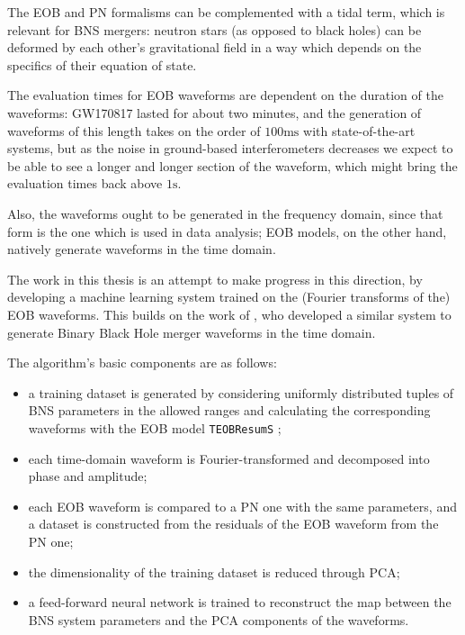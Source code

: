 \documentclass[main.tex]{subfiles}
\begin{document}
The \ac{EOB} and \ac{PN} formalisms can be complemented with a tidal term, which is relevant for \ac{BNS} mergers: neutron stars (as opposed to black holes) can be deformed by each other's gravitational field in a way which depends on the specifics of their equation of state. 

The evaluation times for \ac{EOB} waveforms are dependent on the duration of the waveforms: GW170817 lasted for about two minutes, and the generation of waveforms of this length takes on the order of $100\text{ms}$ with state-of-the-art systems, but as the noise in ground-based interferometers decreases we expect to be able to see a longer and longer section of the waveform, which might bring the evaluation times back above $1\text{s}$. 

Also, the waveforms ought to be generated in the frequency domain, since that form is the one which is used in data analysis;
EOB models, on the other hand, natively generate waveforms in the time domain. 

The work in this thesis is an attempt to make progress in this direction, by developing a machine learning system trained on the (Fourier transforms of the) \ac{EOB} waveforms. 
This builds on the work of \textcite{schmidtMachineLearningGravitational2020}, who developed a similar system to generate Binary Black Hole merger waveforms in the time domain.

The algorithm's basic components are as follows:
\begin{itemize}
    \item a training dataset is generated by considering uniformly distributed tuples of \ac{BNS} parameters in the allowed ranges and calculating the corresponding waveforms with the \ac{EOB} model \texttt{TEOBResumS} \cite[]{nagarTimedomainEffectiveonebodyGravitational2018};
    \item each time-domain waveform is Fourier-transformed and decomposed into phase and amplitude;
    \item each \ac{EOB} waveform is compared to a \ac{PN} one with the same parameters, and a dataset is constructed from the residuals of the \ac{EOB} waveform from the \ac{PN} one;
    \item the dimensionality of the training dataset is reduced through \ac{PCA};
    \item a feed-forward neural network is trained to reconstruct the map between the \ac{BNS} system parameters and the \ac{PCA} components of the waveforms. 
\end{itemize}
\end{document}
